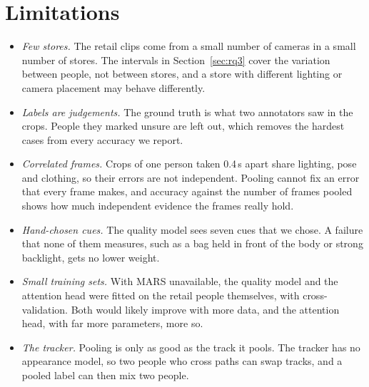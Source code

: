 
\section{Limitations}
\label{sec:limits}
\begin{itemize}
  \item \emph{Few stores.} The retail clips come from a small number of cameras
        in a small number of stores. The intervals in Section~\ref{sec:rq3} cover
        the variation between people, not between stores, and a store with
        different lighting or camera placement may behave differently.
  \item \emph{Labels are judgements.} The ground truth is what two annotators
        saw in the crops. People they marked unsure are left out, which removes
        the hardest cases from every accuracy we report.
  \item \emph{Correlated frames.} Crops of one person taken 0.4\,s apart share
        lighting, pose and clothing, so their errors are not independent. Pooling
        cannot fix an error that every frame makes, and accuracy against the
        number of frames pooled shows how much independent evidence the frames
        really hold.
  \item \emph{Hand-chosen cues.} The quality model sees seven cues that we chose.
        A failure that none of them measures, such as a bag held in front of the
        body or strong backlight, gets no lower weight.
  \item \emph{Small training sets.} With MARS unavailable, the quality model and
        the attention head were fitted on the retail people themselves, with
        cross-validation. Both would likely improve with more data, and the
        attention head, with far more parameters, more so.
  \item \emph{The tracker.} Pooling is only as good as the track it pools. The
        tracker has no appearance model, so two people who cross paths can swap
        tracks, and a pooled label can then mix two people.
\end{itemize}
